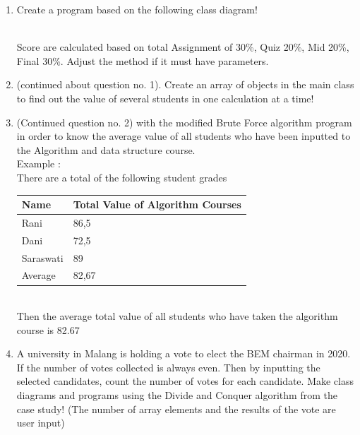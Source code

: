 \documentclass[12pt,titlepage]{article}
\begin{document}
\begin{enumerate}
    \item Create a program based on the following class diagram!
    \mbox{}\\
    \mbox{}\\
    Score are calculated based on total Assignment of 30\%, Quiz 20\%, Mid 20\%, Final 30\%. Adjust the method if it must have parameters.
    \item (continued about question no. 1). Create an array of objects in the main class to find out the value of several students in one calculation at a time!
    \item (Continued question no. 2) with the modified Brute Force algorithm program in order to know the average value of all students who have been inputted to the Algorithm and data structure course. \mbox{}\\
    Example : \mbox{}\\
    There are a total of the following student grades
    \mbox{}\\
    \begin{tabular}{|l|l|}
        \hline
        Name & Total Value of Algorithm Courses \\
        \hline
        Rani & 86,5 \\
        \hline
        Dani & 72,5 \\
        \hline
        Saraswati & 89 \\
        \hline
        Average & 82,67 \\
        \hline
    \end{tabular}
    \mbox{}\\
    Then the average total value of all students who have taken the algorithm course is 82.67
    \item A university in Malang is holding a vote to elect the BEM chairman in 2020. If the number of votes collected is always even. Then by inputting the selected candidates, count the number of votes for each candidate. Make class diagrams and programs using the Divide and Conquer algorithm from the case study! (The number of array elements and the results of the vote are user input) \mbox{}\\

\end{enumerate}
\end{document}
